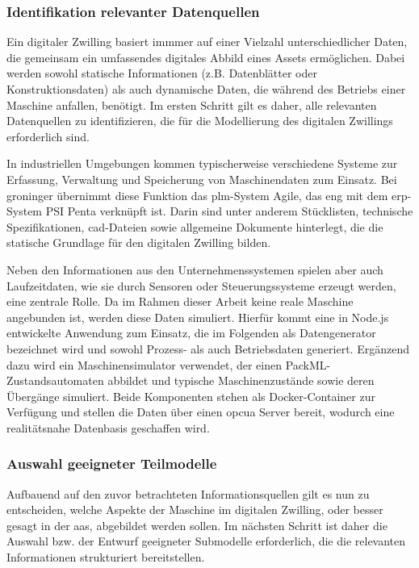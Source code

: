 \subsubsection{Identifikation relevanter Datenquellen}
Ein digitaler Zwilling basiert immmer auf einer Vielzahl unterschiedlicher Daten, die gemeinsam ein umfassendes digitales Abbild eines Assets ermöglichen. 
Dabei werden sowohl statische Informationen (z.B. Datenblätter oder Konstruktionsdaten) als auch dynamische Daten, die während des Betriebs einer Maschine anfallen, benötigt.
Im ersten Schritt gilt es daher, alle relevanten Datenquellen zu identifizieren, die für die Modellierung des digitalen Zwillings erforderlich sind.

In industriellen Umgebungen kommen typischerweise verschiedene Systeme zur Erfassung, Verwaltung und Speicherung von Maschinendaten zum Einsatz.
Bei groninger übernimmt diese Funktion das \acs{plm}-System Agile, das eng mit dem \acs{erp}-System PSI Penta verknüpft ist.
Darin sind unter anderem Stücklisten, technische Spezifikationen, \acs{cad}-Dateien sowie allgemeine Dokumente hinterlegt, die die statische Grundlage  für den digitalen Zwilling bilden.

Neben den Informationen aus den Unternehmenssystemen spielen aber auch Laufzeitdaten, wie sie durch Sensoren oder Steuerungssysteme erzeugt werden, eine zentrale Rolle.
Da im Rahmen dieser Arbeit keine reale Maschine angebunden ist, werden diese Daten simuliert.
Hierfür kommt eine in Node.js entwickelte Anwendung zum Einsatz, die im Folgenden als Datengenerator bezeichnet wird und sowohl Prozess- als auch Betriebsdaten generiert. 
Ergänzend dazu wird ein Maschinensimulator verwendet, der einen PackML-Zustandsautomaten abbildet und typische Maschinenzustände sowie deren Übergänge simuliert. 
Beide Komponenten stehen als Docker-Container zur Verfügung und stellen die Daten über einen \acs{opcua} Server bereit, wodurch eine realitätsnahe Datenbasis geschaffen wird.
\subsubsection{Auswahl geeigneter Teilmodelle}
Aufbauend auf den zuvor betrachteten Informationsquellen gilt es nun zu entscheiden, welche Aspekte der Maschine im digitalen Zwilling, oder besser gesagt in der \acs{aas}, abgebildet werden sollen.
Im nächsten Schritt ist daher die Auswahl bzw. der Entwurf geeigneter Submodelle erforderlich, die die relevanten Informationen strukturiert bereitstellen.

